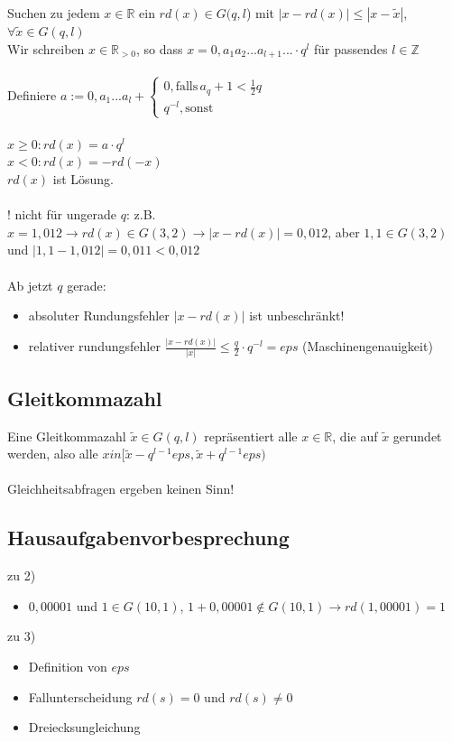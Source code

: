 \documentclass{llncs}
\begin{document}
Suchen zu jedem $x \in \mathbb{R}$ ein $rd(x)  \in G(q,l$) mit $|x-rd(x)| \leq |x-\tilde{x}|$, $\forall \tilde{x} \in G(q,l)$\\
Wir schreiben $x \in \mathbb{R}_{>0}$, so dass $x=0,a_1a_2...a_{l+1}... \cdot q^l$ f\"ur passendes $l \in \mathbb{Z}$\\
\\
Definiere $a:= 0,a_1...a_l + \begin{cases} 0, \text{falls} \, a_q+1 < \frac{1}{2}q \\ q^{-l}, \text{sonst}\end{cases}$\\
\\
$x \geq 0: rd(x) = a \cdot q^l$\\
$x<0: rd(x) = -rd(-x)$\\
$rd(x)$ ist L\"osung.\\
\\
! nicht f\"ur ungerade $q$: z.B. $x = 1,012 \longrightarrow rd(x) \in G(3,2) \longrightarrow |x-rd(x)| = 0,012$, aber $1,1 \in G(3,2)$ und $|1,1 - 1,012| = 0,011 < 0,012$\\
\\
Ab jetzt $q$ gerade:
\begin{itemize}
\item absoluter Rundungsfehler $|x-rd(x)|$ ist unbeschr\"ankt!
\item relativer rundungsfehler $\frac{|x-rd(x)|}{|x|} \leq \frac{q}{2} \cdot q^{-l} = eps$ (Maschinengenauigkeit)
\end{itemize}

\subsection*{Gleitkommazahl}

Eine Gleitkommazahl $\tilde{x} \in G(q,l)$ repr\"asentiert alle $x \in \mathbb{R}$, die auf $\tilde{x}$ gerundet werden, also alle $x in [\tilde{x} - q^{l-1}eps , \tilde{x} + q^{l-1}eps)$\\
\\
Gleichheitsabfragen ergeben keinen Sinn!

\subsection*{Hausaufgabenvorbesprechung}

zu 2)
\begin{itemize}
\item $0,00001$ und $1 \in G(10,1)$, $1+0,00001 \notin G(10,1) \longrightarrow rd(1,00001) = 1$
\end{itemize}
zu 3)
\begin{itemize}
\item Definition von $eps$
\item Fallunterscheidung $rd(s) = 0$ und $rd(s) \neq 0$
\item Dreiecksungleichung
\end{itemize}
\end{document}
